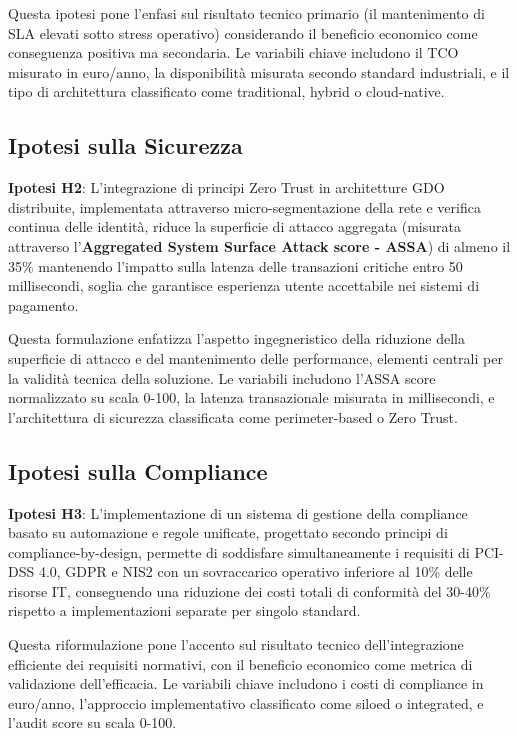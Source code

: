 \documentclass[12pt,a4paper,oneside]{book}
\begin{document}
Questa ipotesi pone l'enfasi sul risultato tecnico primario (il
mantenimento di SLA elevati sotto stress operativo) considerando il beneficio economico come conseguenza positiva ma secondaria. Le
variabili chiave includono il TCO misurato in euro/anno, la disponibilità misurata secondo standard industriali, e il tipo di architettura classificato come traditional, hybrid o cloud-native.

\subsection{\texorpdfstring{\textbf{Ipotesi sulla
Sicurezza}}{1.4.2 Ipotesi sulla Sicurezza}}\label{ipotesi-sulla-sicurezza}

\textbf{Ipotesi H2}: L'integrazione di principi Zero Trust in architetture GDO distribuite, implementata attraverso micro-segmentazione della rete e verifica continua delle identità, riduce la superficie di attacco aggregata (misurata attraverso l'\textbf{Aggregated System Surface Attack score - ASSA}) di almeno il 35\% mantenendo l'impatto sulla latenza delle transazioni critiche entro 50 millisecondi, soglia che garantisce esperienza utente accettabile nei sistemi di pagamento.

Questa formulazione enfatizza l'aspetto ingegneristico della riduzione della superficie di attacco e del mantenimento delle performance, elementi centrali per la validità tecnica della soluzione. Le variabili includono l'ASSA score normalizzato su scala 0-100, la latenza transazionale misurata in millisecondi, e l'architettura di sicurezza classificata come perimeter-based o Zero Trust.

\subsection{\texorpdfstring{\textbf{Ipotesi sulla
Compliance}}{1.4.3 Ipotesi sulla Compliance}}\label{ipotesi-sulla-compliance}

\textbf{Ipotesi H3}: L'implementazione di un sistema di gestione della compliance basato su automazione e regole unificate, progettato secondo principi di compliance-by-design, permette di soddisfare simultaneamente i requisiti di PCI-DSS 4.0, GDPR e NIS2 con un sovraccarico operativo inferiore al 10\% delle risorse IT, conseguendo una riduzione dei costi
totali di conformità del 30-40\% rispetto a implementazioni separate per singolo standard.

Questa riformulazione pone l'accento sul risultato tecnico
dell'integrazione efficiente dei requisiti normativi, con il beneficio economico come metrica di validazione dell'efficacia. Le variabili chiave includono i costi di compliance in euro/anno, l'approccio implementativo classificato come siloed o integrated, e l'audit score su scala 0-100.
\end{document}
